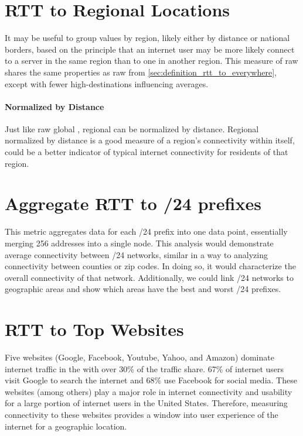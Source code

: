 \section{RTT to Regional Locations}\label{sec:definition_rtt_regional}

It may be useful to group \rtt values by region, likely either by distance or national borders, based on the principle that an internet user may be more likely connect to a server in the same region than to one in another region. This measure of raw \rtt shares the same properties as raw \rtt from \cref{sec:definition_rtt_to_everywhere}, except with fewer high-\rtt destinations influencing averages.

\paragraph{Normalized by Distance}
Just like raw global \rtts, regional \rtts can be normalized by distance. Regional \rtt normalized by distance is a good measure of a region's connectivity within itself, could be a better indicator of typical internet connectivity for residents of that region.

\section{Aggregate RTT to /24 prefixes}\label{sec:definition_rtt_24}

This metric aggregates data for each /24 prefix into one data point, essentially merging 256 \ip addresses into a single node. This analysis would demonstrate average connectivity between /24 networks, similar in a way to analyzing connectivity between counties or zip codes. In doing so, it would characterize the overall connectivity of that network. Additionally, we could link /24 networks to geographic areas and show which areas have the best and worst /24 prefixes.

\section{RTT to Top Websites}\label{sec:definition_rtt_site_ping}
Five websites (Google, Facebook, Youtube, Yahoo, and Amazon) dominate internet traffic in the \us with over 30\% of the traffic share. 67\% of \us internet users visit Google to search the internet and 68\% use Facebook for social media\cite{Tachalova2017}. These websites (among others) play a major role in internet connectivity and usability for a large portion of internet users in the United States. Therefore, measuring connectivity to these websites provides a window into user experience of the internet for a geographic location.

